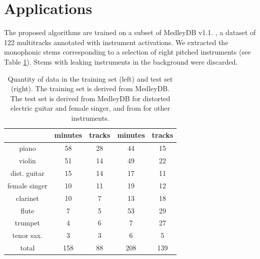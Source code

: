 \documentclass{article}
\begin{document}
\section{Applications}\label{sec:single-instrument}
The proposed algorithms are trained on a subset of MedleyDB v1.1. \cite{Bittner2014},
a dataset of 122 multitracks annotated with instrument activations.
We extracted the monophonic stems corresponding to a selection of eight pitched
instruments (see Table \ref{table:single-label-durations}).
Stems with leaking instruments in the background were discarded.

\begin{table}
    \begin{center}
    \begin{tabular}{|c|cc|cc|}
        \hline
        & minutes & tracks & minutes & tracks \\
        \hline
         piano & 58 & 28 & 44 & 15 \\
         violin & 51 & 14 & 49 & 22 \\
         dist. guitar & 15 & 14 & 17 & 11 \\
           female singer & 10 & 11 & 19 & 12 \\
        clarinet & 10 & 7 & 13 & 18 \\
        flute & 7 & 5 & 53 & 29 \\
        trumpet & 4 & 6 & 7 & 27 \\
        tenor sax. & 3 & 3 & 6 & 5 \\  
        \hline
        total & 158 & 88 & 208 & 139 \\
        \hline
    \end{tabular}
    \end{center}
    \caption{
    Quantity of data in the training set (left) and test set (right).
    The training set is derived from MedleyDB.
    The test set is derived from MedleyDB for distorted electric guitar and female singer,
    and from \cite{Joder2009} for other instruments.
    \label{table:single-label-durations}}
\end{table}
\end{document}
